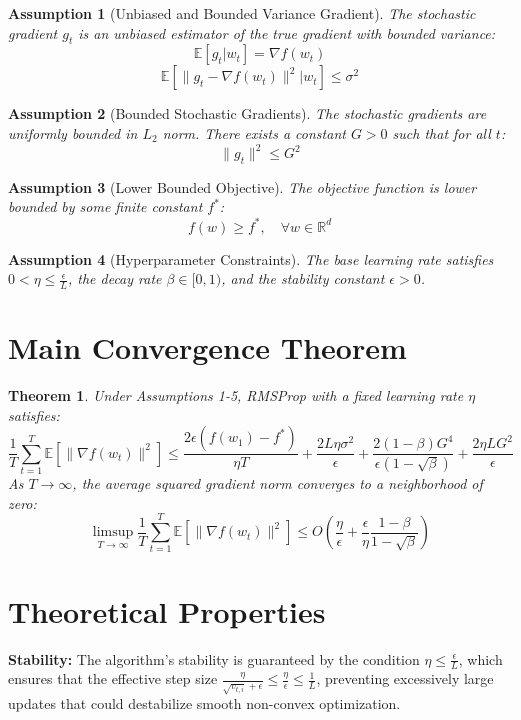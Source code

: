 \documentclass{article}
\newtheorem{theorem}{Theorem}
\newtheorem{assumption}{Assumption}
\begin{document}
\begin{assumption}[Unbiased and Bounded Variance Gradient]
The stochastic gradient $g_t$ is an unbiased estimator of the true gradient with bounded variance:
$$ \mathbb{E}[g_t | w_t] = \nabla f(w_t) $$
$$ \mathbb{E}[\|g_t - \nabla f(w_t)\|^2 | w_t] \leq \sigma^2 $$
\end{assumption}

\begin{assumption}[Bounded Stochastic Gradients]
The stochastic gradients are uniformly bounded in $L_2$ norm. There exists a constant $G > 0$ such that for all $t$:
$$ \|g_t\|^2 \leq G^2 $$
\end{assumption}

\begin{assumption}[Lower Bounded Objective]
The objective function is lower bounded by some finite constant $f^*$:
$$ f(w) \geq f^*, \quad \forall w \in \mathbb{R}^d $$
\end{assumption}

\begin{assumption}[Hyperparameter Constraints]
The base learning rate satisfies $0 < \eta \leq \frac{\epsilon}{L}$, the decay rate $\beta \in [0, 1)$, and the stability constant $\epsilon > 0$.
\end{assumption}

\section*{Main Convergence Theorem}
\begin{theorem}
Under Assumptions 1-5, RMSProp with a fixed learning rate $\eta$ satisfies:
$$ \frac{1}{T} \sum_{t=1}^T \mathbb{E}[\|\nabla f(w_t)\|^2] \leq \frac{2\epsilon (f(w_1) - f^*)}{\eta T} + \frac{2L\eta\sigma^2}{\epsilon} + \frac{2(1-\beta)G^4}{\epsilon(1-\sqrt{\beta})} + \frac{2\eta L G^2}{\epsilon} $$
As $T \to \infty$, the average squared gradient norm converges to a neighborhood of zero:
$$ \limsup_{T \to \infty} \frac{1}{T} \sum_{t=1}^T \mathbb{E}[\|\nabla f(w_t)\|^2] \leq O\left(\frac{\eta}{\epsilon} + \frac{\epsilon}{\eta} \frac{1-\beta}{1-\sqrt{\beta}}\right) $$
\end{theorem}

\section*{Theoretical Properties}
\textbf{Stability:} The algorithm's stability is guaranteed by the condition $\eta \leq \frac{\epsilon}{L}$, which ensures that the effective step size $\frac{\eta}{\sqrt{v_{t,i}}+\epsilon} \leq \frac{\eta}{\epsilon} \leq \frac{1}{L}$, preventing excessively large updates that could destabilize smooth non-convex optimization.
\end{document}
